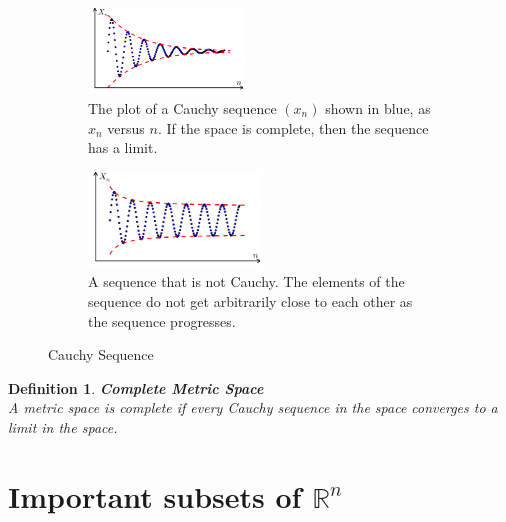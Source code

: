 \documentclass[11pt]{book} %
\newtheorem{definition}{Definition}[section]
\begin{document}
\begin{figure}[H]
    \begin{subfigure}{0.5\textwidth}
        \centering
        \includegraphics[width=0.45\textwidth]{Figs/Cauchy_sequence_illustration.png}
        \caption{The plot of a Cauchy sequence \( (x_n) \) shown in blue, as \( x_n \) versus \( n \). If the space is complete, then the sequence has a limit.}
    \end{subfigure}
    \hfill
    \begin{subfigure}{0.45\textwidth}
        \centering
        \includegraphics[width=0.5\textwidth]{Figs/Cauchy_sequence_illustration2.png}
        \caption{A sequence that is not Cauchy. The elements of the sequence do not get arbitrarily close to each other as the sequence progresses.}
    \end{subfigure}
    \caption{Cauchy Sequence}
\end{figure}

\begin{definition}{\textbf{Complete Metric Space}} \\
    A metric space is complete if every Cauchy sequence in the space converges to a limit in the space.
\end{definition}



\bigbreak


\section{Important subsets of $\mathbb{R}^n$}
\end{document}
